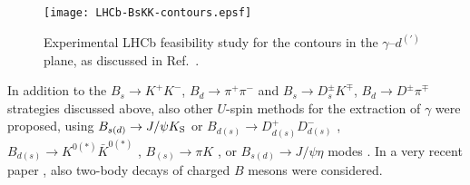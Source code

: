 \documentclass[11pt]{cernrep}
\begin{document}
\begin{figure}
   \centering
   \texttt{[image: LHCb-BsKK-contours.epsf]} 
   \vspace*{-0.6truecm}
   \caption{Experimental LHCb feasibility study for the contours in the
   $\gamma$--$d^{(')}$ plane, as discussed in 
   Ref.~\cite{LHCb-analyses}.}\label{fig:Bs-Bd-contours-LHCb}
\end{figure}


In addition to the $B_s\to K^+K^-$, $B_d\to\pi^+\pi^-$ and
$B_s\to D_s^\pm K^\mp$, $B_d\to D^\pm \pi^\mp$ strategies discussed
above, also other $U$-spin methods for the extraction of $\gamma$ were 
proposed, using 
$B_{s(d)}\to J/\psi K_{\rm S}$ or $B_{d(s)}\to D_{d(s)}^+D_{d(s)}^-$ 
\cite{RF-BdsPsiK}, $B_{d(s)}\to K^{0(*)}\bar K^{0(*)}$ \cite{RF-Phys-Rep,RF-ang}, 
$B_{(s)}\to \pi K$ \cite{GR-BspiK}, or $B_{s(d)}\to J/\psi \eta$
modes \cite{skands}. In a very recent paper \cite{SoSu}, also two-body decays 
of charged $B$ mesons were considered.



%
%
%
\boldmath
\end{document}
